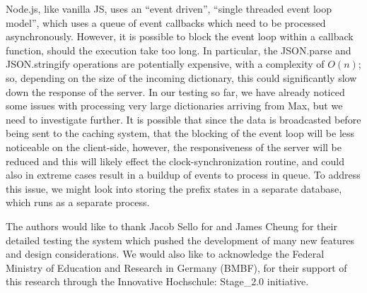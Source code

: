 Node.js, like vanilla JS, uses an ``event driven'', ``single threaded event loop model'', which uses a queue of event callbacks which need to be processed asynchronously.
However, it is possible to block the event loop\cite{node-eventloop} within a callback function, should the execution take too long.
In particular, the JSON.parse and JSON.stringify operations are potentially expensive, with a complexity of $O(n)$; so, depending on the size of the incoming dictionary, this could significantly slow down the response of the server.
In our testing so far, we have already noticed some issues with processing very large dictionaries arriving from Max, but we need to investigate further.
It is possible that since the data is broadcasted before being sent to the caching system, that the blocking of the event loop will be less noticeable on the client-side, however, the responsiveness of the server will be reduced and this will likely effect the clock-synchronization routine, and could also in extreme cases result in a buildup of events to process in queue.
To address this issue, we might look into storing the prefix states in a separate database, which runs as a separate process.


\begin{acknowledgments}
The authors would like to thank Jacob Sello for and James Cheung for their detailed testing the system which pushed the development of many new features and design considerations. We would also like to acknowledge the Federal Ministry of Education and Research in Germany (BMBF), for their support of this research through the Innovative Hochschule: Stage\_2.0 initiative.
\end{acknowledgments} 

\balance







